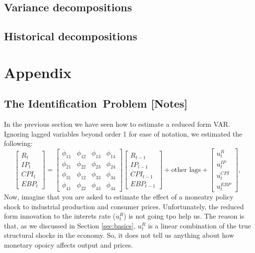 \documentclass[10pt]{article}
\begin{document}
\subsection{Variance decompositions}

\subsection{Historical decompositions}




\appendix

\section{Appendix}

\subsection{The Identification\ Problem {\color{note} {\protect\small
{[Notes]}}}}

In the previous section we have seen how to estimate a reduced form VAR.
Ignoring lagged variables beyond order 1 for ease of notation, we estimated
the following:%
\begin{equation}
\begin{bmatrix}
R_{t} \\ 
IP_{t} \\ 
CPI_{t} \\ 
EBP_{t}%
\end{bmatrix}%
=\left[ 
\begin{array}{cccc}
\phi _{11} & \phi _{12} & \phi _{13} & \phi _{14} \\ 
\phi _{21} & \phi _{22} & \phi _{23} & \phi _{24} \\ 
\phi _{31} & \phi _{12} & \phi _{33} & \phi _{34} \\ 
\phi _{41} & \phi _{22} & \phi _{43} & \phi _{44}%
\end{array}%
\right] 
\begin{bmatrix}
R_{t-1} \\ 
IP_{t-1} \\ 
CPI_{t-1} \\ 
EBP_{t-1}%
\end{bmatrix}%
+\text{other lags}+%
\begin{bmatrix}
u_{t}^{R} \\ 
u_{t}^{IP} \\ 
u_{t}^{CPI} \\ 
u_{t}^{EBP}%
\end{bmatrix}%
,
\end{equation}%
Now, imagine that you are asked to estimate the effect of a moneatry policy
shock to industrial production and consumer prices. Unfortunately, the
reduced form innovation to the interets rate ($u_{t}^{R}$) is not going tpo
help us. The reason is that, as we discussed in Section \ref{sec:basics}, $%
u_{t}^{R}$ is a linear combination of the true structural shocks in the
economy. So, it does not tell us anything about how monetary opoicy affects
output and prices. 
\end{document}
